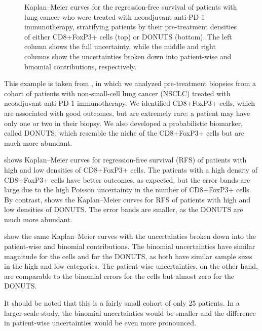 \documentclass[article]{jss}
\newcommand{\KM}{Kaplan--Meier} %
\begin{document}
\begin{figure}[ht]
\begin{subfigure}[t]{\figwidth}
    \caption{\label{fig:lung-dataset-donuts-binomial}}
  \end{subfigure}
  \caption{\label{fig:lung-dataset} \KM{} curves for the regression-free survival of patients with lung cancer who were treated with neoadjuvant anti-PD-1 immunotherapy, stratifying patients by their pre-treatment densities of either CD8+FoxP3+ cells (top) or DONUTS (bottom). The left column shows the full uncertainty, while the middle and right columns show the uncertainties broken down into patient-wise and binomial contributions, respectively.}
\end{figure}

This example is taken from \citet{DONUTS}, in which we analyzed pre-treatment biopsies from a cohort of patients with non-small-cell lung cancer (NSCLC) treated with neoadjuvant anti-PD-1 immunotherapy. We identified CD8+FoxP3+ cells, which are associated with good outcomes, but are extremely rare: a patient may have only one or two in their biopsy. We also developed a probabilistic biomarker, called DONUTS, which resemble the niche of the CD8+FoxP3+ cells but are much more abundant.

 shows \KM{} curves for regression-free survival (RFS) of patients with high and low densities of CD8+FoxP3+ cells. The patients with a high density of CD8+FoxP3+ cells have better outcomes, as expected, but the error bands are large due to the high Poisson uncertainty in the number of CD8+FoxP3+ cells. By contrast,  shows the \KM{} curves for RFS of patients with high and low densities of DONUTS\@. The error bands are smaller, as the DONUTS are much more abundant.

 show the same \KM{} curves with the uncertainties broken down into the patient-wise and binomial contributions. The binomial uncertainties have similar magnitude for the cells and for the DONUTS, as both have similar sample sizes in the high and low categories. The patient-wise uncertainties, on the other hand, are comparable to the binomial errors for the cells but almost zero for the DONUTS\@.

It should be noted that this is a fairly small cohort of only 25 patients. In a larger-scale study, the binomial uncertainties would be smaller and the difference in patient-wise uncertainties would be even more pronounced.
\end{document}
